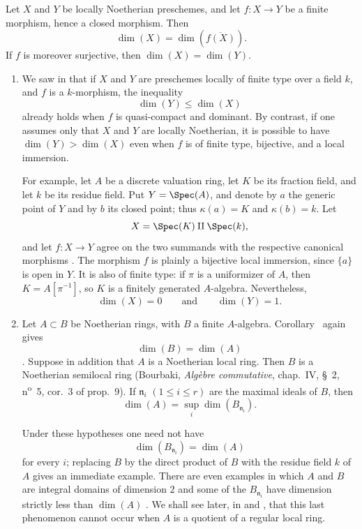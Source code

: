 \begin{corollary}[5.4.2]
\label{IV.5.4.2}
Let $X$ and $Y$ be locally Noetherian preschemes, and let
$f:X\to Y$ be a finite morphism, hence a closed morphism.
Then
\[
\dim(X)=\dim(\overline{f(X)}).
\]
If $f$ is moreover surjective, then $\dim(X)=\dim(Y)$.
\end{corollary}

\begin{remarks}[5.4.3]
\label{IV.5.4.3}
\begin{enumerate}[{\rm(i)}]
\item
{}
\label{IV.5.4.3.i}
We saw in  that if $X$ and $Y$ are preschemes locally
of finite type over a field $k$, and $f$ is a $k$-morphism, the
inequality
\[
\dim(Y)\leq\dim(X)
\]
already holds when $f$ is quasi-compact and dominant.
By contrast, if one assumes only that $X$ and $Y$ are locally
Noetherian, it is possible to have $\dim(Y)>\dim(X)$ even when $f$ is
of finite type, bijective, and a local immersion.

For example, let $A$ be a discrete valuation ring, let $K$ be its
fraction field, and let $k$ be its residue field.
Put $Y=\Spec(A)$, and denote by $a$ the generic point of $Y$ and by
$b$ its closed point; thus $\kappa(a)=K$ and $\kappa(b)=k$.
Let
\[
X=\Spec(K)\amalg\Spec(k),
\]
and let $f:X\to Y$ agree on the two summands with the respective
canonical morphisms .
The morphism $f$ is plainly a bijective local immersion, since
$\{a\}$ is open in $Y$.
It is also of finite type: if $\pi$ is a uniformizer of $A$, then
$K=A[\pi^{-1}]$, so $K$ is a finitely generated $A$-algebra.
Nevertheless,
\[
\dim(X)=0
\qquad\text{and}\qquad
\dim(Y)=1.
\]

\item
{}
\label{IV.5.4.3.ii}
Let $A\subset B$ be Noetherian rings, with $B$ a finite
$A$-algebra.
Corollary~ again gives
\[
\dim(B)=\dim(A)
\]
.
Suppose in addition that $A$ is a Noetherian local ring.
Then $B$ is a Noetherian semilocal ring
(Bourbaki, \emph{Alg\`ebre commutative}, chap.~IV, \S~2,
n\textsuperscript{o}~5, cor.~3 of prop.~9).
If $\mathfrak n_i$ $(1\leq i\leq r)$ are the maximal ideals of $B$,
then
\begin{equation}
\dim(A)=\sup_i\dim(B_{\mathfrak n_i}).
\tag{5.4.3.1}\label{IV.5.4.3.1}
\end{equation}

Under these hypotheses one need not have
\[
\dim(B_{\mathfrak n_i})=\dim(A)
\]
for every $i$; replacing $B$ by the direct product of $B$ with the
residue field $k$ of $A$ gives an immediate example.
There are even examples in which $A$ and $B$ are integral domains of
dimension $2$ and some of the $B_{\mathfrak n_i}$ have dimension
strictly less than $\dim(A)$ .
We shall see later, in  and , that
this last phenomenon cannot occur when $A$ is a quotient of a
regular local ring.
\end{enumerate}
\end{remarks}
